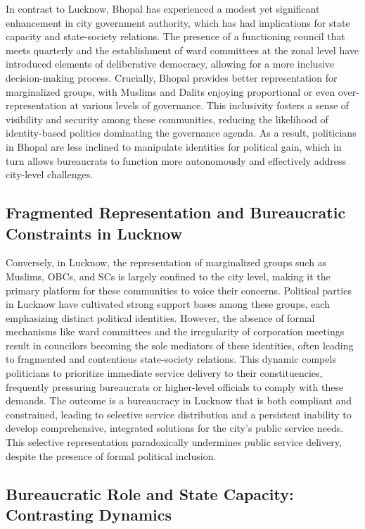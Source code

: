 In contrast to Lucknow, Bhopal has experienced a modest yet significant enhancement in city government authority, which has had implications for state capacity and state-society relations. The presence of a functioning council that meets quarterly and the establishment of ward committees at the zonal level have introduced elements of deliberative democracy, allowing for a more inclusive decision-making process. Crucially, Bhopal provides better representation for marginalized groups, with Muslims and Dalits enjoying proportional or even over-representation at various levels of governance. This inclusivity fosters a sense of visibility and security among these communities, reducing the likelihood of identity-based politics dominating the governance agenda. As a result, politicians in Bhopal are less inclined to manipulate identities for political gain, which in turn allows bureaucrats to function more autonomously and effectively address city-level challenges.

\subsection{Fragmented Representation and Bureaucratic Constraints in Lucknow}

Conversely, in Lucknow, the representation of marginalized groups such as Muslims, OBCs, and SCs is largely confined to the city level, making it the primary platform for these communities to voice their concerns. Political parties in Lucknow have cultivated strong support bases among these groups, each emphasizing distinct political identities. However, the absence of formal mechanisms like ward committees and the irregularity of corporation meetings result in councilors becoming the sole mediators of these identities, often leading to fragmented and contentious state-society relations. This dynamic compels politicians to prioritize immediate service delivery to their constituencies, frequently pressuring bureaucrats or higher-level officials to comply with these demands. The outcome is a bureaucracy in Lucknow that is both compliant and constrained, leading to selective service distribution and a persistent inability to develop comprehensive, integrated solutions for the city's public service needs. This selective representation paradoxically undermines public service delivery, despite the presence of formal political inclusion.

\subsection{Bureaucratic Role and State Capacity: Contrasting Dynamics}

